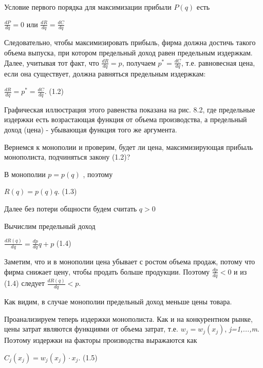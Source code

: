 \documentclass[12pt, 4paper]{book}
\begin{document}
{Условие первого порядка для максимизации прибыли $P(q)$ есть
\begin{center}
$\frac{dP}{dq}=0 $ или $\frac{dR}{dq}=\frac{dC}{dq}$
\end{center}
Следовательно, чтобы максимизировать прибыль, фирма должна достичь такого объема выпуска, при котором предельный доход равен предельным издержкам. Далее, учитывая тот факт, что $\frac{dR}{dq}=p$, получаем $p^{*}=\frac{dC}{dq}$, т.е. равновесная цена, если она существует, должна равняться предельным издержкам:
\begin{center}
$\frac{dR}{dq}=p^{*}=\frac{dC}{dq}.$ (1.2)
\end{center}
\par

Графическая иллюстрация этого равенства показана на рис. 8.2, где предельные издержки есть возрастающая функция от объема производства, а предельный доход (цена) - убывающая функция того же аргумента.
\par

Вернемся к монополии и проверим, будет ли цена, максимизирующая прибыль монополиста, подчиняться закону (1.2)?
\par

В монополии $p=p(q)$ , поэтому
\begin{center}
$R(q)=p(q)q$. (1.3)
\end{center}
\par

Далее без потери общности будем считать $q>0$
\par

Вычислим предельный доход
\begin{center}
$\frac{dR(q)}{dq}=\frac{dp}{dq}q+p$ (1.4)
\end{center}
\par

Заметим, что и в монополии цена убывает с ростом объема продаж, потому что фирма снижает цену, чтобы продать больше продукции. Поэтому $\frac{dp}{dq}<0$ и из (1.4) следует $\frac{dR(q)}{dq}<p.$
\par

Как видим, в случае монополии предельный доход меньше цены товара.
\par

Проанализируем теперь издержки монополиста. Как и на конкурентном рынке, цены затрат являются функциями от объема затрат, т.е. $w_j = w_j(x_j)$, \textit{j=1,...,m}. Поэтому издержки на факторы производства выражаются как
\begin{center}
$C_j(x_j)=w_j(x_j)\cdot x_j$. (1.5)
\end{center}
\par

}
\end{document}

